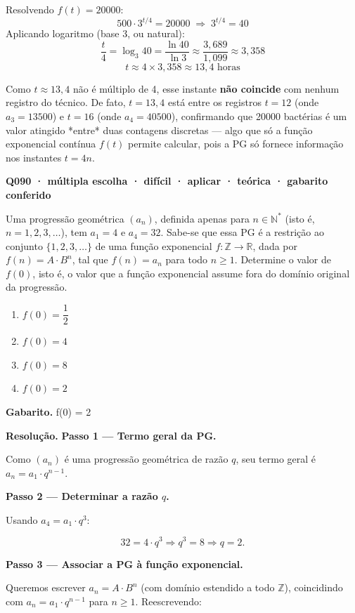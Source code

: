\documentclass[11pt,a4paper]{article}
\begin{document}
Resolvendo $f(t) = 20000$:
$$500\cdot 3^{t/4} = 20000 \;\Rightarrow\; 3^{t/4} = 40$$
Aplicando logaritmo (base 3, ou natural):
$$\frac{t}{4} = \log_3 40 = \frac{\ln 40}{\ln 3} \approx \frac{3{,}689}{1{,}099} \approx 3{,}358$$
$$t \approx 4 \times 3{,}358 \approx 13{,}4 \text{ horas}$$

Como $t \approx 13{,}4$ não é múltiplo de 4, esse instante \textbf{não coincide} com nenhum registro do técnico. De fato, $t=13{,}4$ está entre os registros $t=12$ (onde $a_3 = 13500$) e $t=16$ (onde $a_4 = 40500$), confirmando que 20000 bactérias é um valor atingido *entre* duas contagens discretas — algo que só a função exponencial contínua $f(t)$ permite calcular, pois a PG só fornece informação nos instantes $t=4n$.

\bigskip\noindent\textbf{Q090 · múltipla escolha · difícil · aplicar · teórica · gabarito conferido}\par\nopagebreak
Uma progressão geométrica $(a_n)$, definida apenas para $n \in \mathbb{N}^*$ (isto é, $n = 1, 2, 3, \dots$), tem $a_1 = 4$ e $a_4 = 32$. Sabe-se que essa PG é a restrição ao conjunto $\{1,2,3,\dots\}$ de uma função exponencial $f:\mathbb{Z}\to\mathbb{R}$, dada por $f(n) = A\cdot B^n$, tal que $f(n) = a_n$ para todo $n \geq 1$. Determine o valor de $f(0)$, isto é, o valor que a função exponencial assume fora do domínio original da progressão.
\begin{enumerate}[label=(\alph*)]
\item $f(0) = \dfrac{1}{2}$
\item $f(0) = 4$
\item $f(0) = 8$
\item $f(0) = 2$
\end{enumerate}

\textbf{Gabarito.} f(0) = 2

\textbf{Resolução.} \textbf{Passo 1 — Termo geral da PG.}

Como $(a_n)$ é uma progressão geométrica de razão $q$, seu termo geral é $a_n = a_1\cdot q^{n-1}$.

\textbf{Passo 2 — Determinar a razão $q$.}

Usando $a_4 = a_1\cdot q^3$:

$$32 = 4\cdot q^3 \Rightarrow q^3 = 8 \Rightarrow q = 2.$$

\textbf{Passo 3 — Associar a PG à função exponencial.}

Queremos escrever $a_n = A\cdot B^n$ (com domínio estendido a todo $\mathbb{Z}$), coincidindo com $a_n = a_1\cdot q^{n-1}$ para $n\geq 1$. Reescrevendo:
\end{document}
